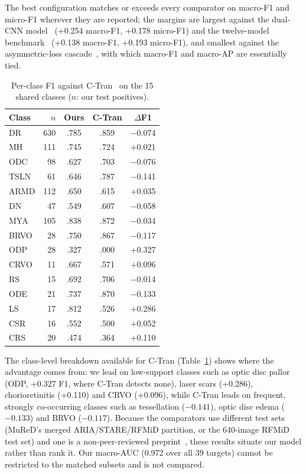 \documentclass[conference]{IEEEtran}
\begin{document}
The best configuration matches or exceeds every comparator on macro-F1 and micro-F1
wherever they are reported; the margins are largest against the dual-CNN model~\cite{mahmood2026} (+0.254
macro-F1, +0.178 micro-F1) and the twelve-model benchmark~\cite{dey2026} (+0.138
macro-F1, +0.193 micro-F1), and smallest against the asymmetric-loss
cascade~\cite{saikia2026}, with which macro-F1 and macro-AP are
essentially tied. 
\begin{table}[t]
\centering
\caption{Per-class F1 against C-Tran~\cite{rodriguez2022} on the 15 shared classes
($n$: our test positives).}
\label{tab:ctran}
\setlength{\tabcolsep}{6pt}
\footnotesize
\begin{tabular}{@{}lrccc@{}}
\toprule
Class & $n$ & Ours & C-Tran & $\Delta$F1\\
\midrule
DR & 630 & .785 & .859 & $-$0.074\\
MH & 111 & .745 & .724 & $+$0.021\\
ODC & 98 & .627 & .703 & $-$0.076\\
TSLN & 61 & .646 & .787 & $-$0.141\\
ARMD & 112 & .650 & .615 & $+$0.035\\
DN & 47 & .549 & .607 & $-$0.058\\
MYA & 105 & .838 & .872 & $-$0.034\\
BRVO & 28 & .750 & .867 & $-$0.117\\
ODP & 28 & .327 & .000 & $+$0.327\\
CRVO & 11 & .667 & .571 & $+$0.096\\
RS & 15 & .692 & .706 & $-$0.014\\
ODE & 21 & .737 & .870 & $-$0.133\\
LS & 17 & .812 & .526 & $+$0.286\\
CSR & 16 & .552 & .500 & $+$0.052\\
CRS & 20 & .474 & .364 & $+$0.110\\
\bottomrule
\end{tabular}
\end{table}
The class-level breakdown available for C-Tran (Table~\ref{tab:ctran}) shows where the
advantage comes from: we lead on low-support classes such as optic disc pallor
(ODP, +0.327 F1, where C-Tran detects none), laser scars (+0.286), chorioretinitis
(+0.110) and CRVO (+0.096), while C-Tran leads on frequent, strongly co-occurring
classes such as tessellation ($-0.141$), optic disc edema ($-0.133$) and BRVO
($-0.117$). Because the comparators use different test sets (MuReD's merged
ARIA/STARE/RFMiD partition, or the 640-image RFMiD test set) and one is a
non-peer-reviewed preprint~\cite{saikia2026}, these results situate our model
rather than rank it. Our macro-AUC (0.972 over all 39 targets) cannot be restricted
to the matched subsets and is not compared.
\end{document}
